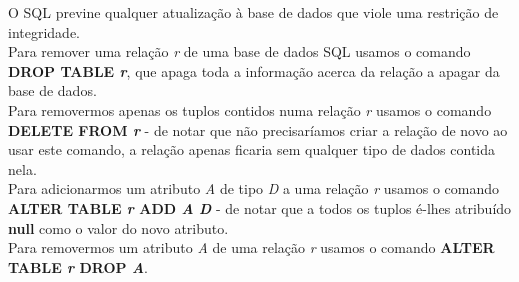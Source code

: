 \documentclass[titlepage]{book}
\theoremstyle{definition}
\begin{document}
O SQL previne qualquer atualização à base de dados que viole uma restrição de integridade.\\
Para remover uma relação \textit{r} de uma base de dados SQL usamos o comando \textbf{DROP TABLE \textit{r}}, que apaga toda a informação acerca da relação a apagar da base de dados. \\
Para removermos apenas os tuplos contidos numa relação \textit{r} usamos o comando \textbf{DELETE FROM \textit{r}} - de notar que não precisaríamos criar a relação de novo ao usar este comando, a relação apenas ficaria sem qualquer tipo de dados contida nela. \\
Para adicionarmos um atributo \textit{A} de tipo \textit{D} a uma relação \textit{r} usamos o comando \textbf{ALTER TABLE \textit{r} ADD \textit{A} \textit{D}} - de notar que a todos os tuplos é-lhes atribuído \textbf{null} como o valor do novo atributo. \\
Para removermos um atributo \textit{A} de uma relação \textit{r} usamos o comando \textbf{ALTER TABLE \textit{r} DROP \textit{A}}.\\
\end{document}
